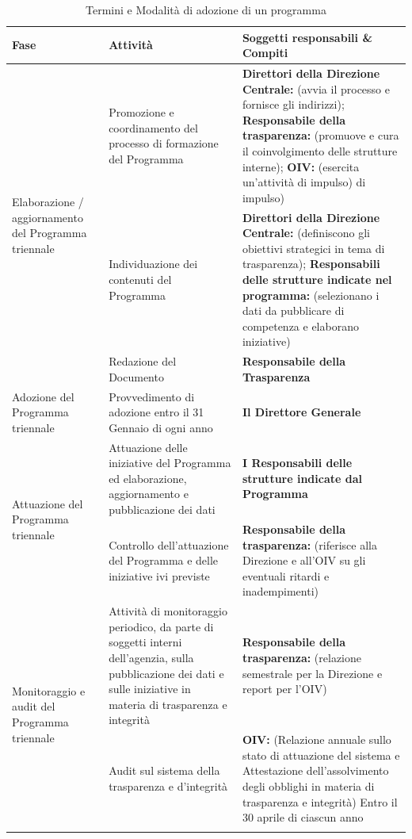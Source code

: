 \begin{longtable}{p{}|p{}|p{}}
\textbf{Fase} & \textbf{Attività} & \textbf{Soggetti responsabili \& Compiti} \\
\midrule

\endhead



\multirow{3}{0.2\textwidth}{ \vfill Elaborazione / aggiornamento del
Programma triennale} 
	& Promozione e coordinamento del processo di formazione del Programma 
	& \textbf{{\color{Plum}Direttori della Direzione Centrale}:} (avvia il processo e fornisce gli indirizzi);
	\newline
	\textbf{{\color{Plum} Responsabile della trasparenza}:} (promuove e cura il coinvolgimento delle strutture interne);
	\newline
	\textbf{{\color{Plum}OIV\ped{g}}:}
 (esercita un'attività di impulso)
di impulso) \\ \cline{2-3}
 & Individuazione dei contenuti del Programma 
 & \textbf{{\color{Plum}Direttori della Direzione Centrale}:} (definiscono gli obiettivi strategici in tema di trasparenza); \newline 
   \textbf{{\color{Plum} Responsabili delle strutture indicate nel programma}:} (selezionano i dati da pubblicare di competenza e elaborano iniziative)\\ \cline{2-3}
 & Redazione del Documento & \textbf{{\color{Plum}Responsabile della Trasparenza}}\\
\midrule
\vfill Adozione del Programma triennale & Provvedimento di adozione entro il 31 Gennaio di ogni anno & \textbf{{\color{Plum} Il Direttore Generale}} \\
\midrule

\multirow{2}{0.2\textwidth}{ \vfill Attuazione del Programma triennale} & Attuazione delle iniziative del Programma ed elaborazione, aggiornamento e pubblicazione dei dati & \textbf{{\color{Plum}I Responsabili delle strutture indicate dal Programma}} \\ \cline{2-3}
 & Controllo dell'attuazione del Programma e delle iniziative ivi previste & \textbf{{\color{Plum}Responsabile della trasparenza}:} (riferisce alla Direzione e all'OIV su gli eventuali ritardi e inadempimenti) \\ 

\midrule

\multirow{2}{0.2\textwidth}{\vfill Monitoraggio e audit del Programma triennale} 
& Attività di monitoraggio periodico, da parte di soggetti interni dell'agenzia, sulla pubblicazione dei dati e sulle iniziative in materia di trasparenza e integrità
& \textbf{{\color{Plum}Responsabile della trasparenza}:} (relazione semestrale per la Direzione e report per l'OIV) \\ \cline{2-3}
 & Audit sul sistema della trasparenza e d'integrità 
  & \textbf{{\color{Plum}OIV}:} (Relazione annuale sullo stato di attuazione del sistema e Attestazione dell'assolvimento degli obblighi in materia di trasparenza e integrità)
Entro il 30 aprile di ciascun anno \\
\bottomrule
\caption{Termini e Modalità di adozione di un programma}
\end{longtable}

